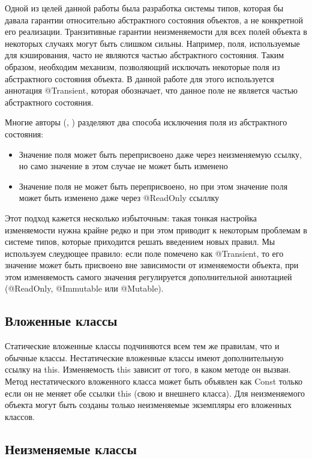 Одной из целей данной работы была разработка системы типов, которая бы давала гарантии относительно абстрактного состояния объектов, а не конкретной его реализации. Транзитивные гарантии неизменяемости для всех полей объекта в некоторых случаях могут быть слишком сильны. Например, поля, используемые для кэширования, часто не являются частью абстрактного состояния. Таким образом, необходим механизм, позволяющий исключать некоторые поля из абстрактного состояния объекта. В данной работе для этого используется аннотация @Transient, которая обозначает, что данное поле не является частью абстрактного состояния. 

Многие авторы (\cite{Zibin2007}, \cite{Tschantz2006}) разделяют два способа исключения поля из абстрактного состояния:
\begin{itemize}
\item{Значение поля может быть переприсвоено даже через неизменяемую ссылку, но само значение в этом случае не может быть изменено}
\item{Значение поля не может быть переприсвоено, но при этом значение поля может быть изменено даже через @ReadOnly ссыллку}
\end{itemize}
Этот подход кажется несколько избыточным: такая тонкая настройка изменяемости нужна крайне редко и при этом приводит к некоторым проблемам в системе типов, которые приходится решать введением новых правил. Мы используем слеудющее правило: если поле помечено как @Transient, то его значение может быть присвоено вне зависимости от изменяемости объекта, при этом изменяемость самого значения регулируется дополнительной аннотацией (@ReadOnly, @Immutable или @Mutable).

\subsection{Вложенные классы}

Статические вложенные классы подчиняются всем тем же правилам, что и обычные классы. Нестатические вложенные классы имеют дополнительную ссылку на this. Изменяемость this зависит от того, в каком методе он вызван. Метод нестатического вложенного класса может быть объявлен как Const только если он не меняет обе ссылки this (свою и внешнего класса). Для неизменяемого объекта могут быть созданы только неизменяемые экземпляры его вложенных классов. 

\subsection{Неизменяемые классы}

